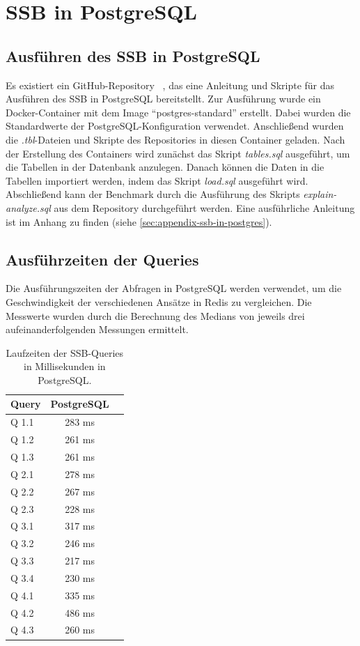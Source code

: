 \chapter{SSB in PostgreSQL}
\section{Ausführen des SSB in PostgreSQL}

Es existiert ein GitHub-Repository ~\cite{nukoyokohama_ssb-postgres_2023}, das eine Anleitung und Skripte für das Ausführen des \ac{SSB} in PostgreSQL bereitstellt.
Zur Ausführung wurde ein Docker-Container mit dem Image \enquote{postgres-standard} erstellt.
Dabei wurden die Standardwerte der PostgreSQL-Konfiguration verwendet.
Anschließend wurden die \emph{.tbl}-Dateien und Skripte des Repositories in diesen Container geladen. 
Nach der Erstellung des Containers wird zunächst das Skript \emph{tables.sql} ausgeführt, um die Tabellen in der Datenbank anzulegen.
Danach können die Daten in die Tabellen importiert werden, indem das Skript \emph{load.sql} ausgeführt wird.
Abschließend kann der Benchmark durch die Ausführung des Skripts \emph{explain-analyze.sql} aus dem Repository durchgeführt werden.
Eine ausführliche Anleitung ist im Anhang zu finden (siehe \cref{sec:appendix-ssb-in-postgres}).
\newpage
\section{Ausführzeiten der Queries} %
Die Ausführungszeiten der Abfragen in PostgreSQL werden verwendet, um die Geschwindigkeit der verschiedenen Ansätze in Redis zu vergleichen. Die Messwerte wurden durch die Berechnung des Medians von jeweils drei aufeinanderfolgenden Messungen ermittelt.
\begin{table}[h]
\centering
\begin{tabular}{lcc}
\hline
Query & PostgreSQL \\ \hline
Q 1.1 & 283 ms       \\
Q 1.2 & 261 ms       \\
Q 1.3 & 261 ms       \\
Q 2.1 & 278 ms       \\
Q 2.2 & 267 ms       \\
Q 2.3 & 228 ms       \\
Q 3.1 & 317 ms       \\
Q 3.2 & 246 ms       \\
Q 3.3 & 217 ms       \\
Q 3.4 & 230 ms       \\
Q 4.1 & 335 ms       \\
Q 4.2 & 486 ms       \\
Q 4.3 & 260 ms       \\ \hline
\end{tabular}
\caption{Laufzeiten der SSB-Queries in Millisekunden in PostgreSQL.}
\label{tab:results-postgres}
\end{table}

